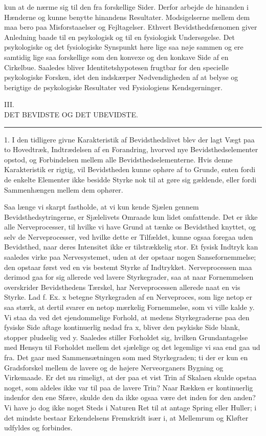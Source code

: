 \documentclass[12pt,a4paper,openany]{book}
\newcommand{\opage}[1]{\marginnote{\footnotesize\textit{[#1]}}}
\begin{document}
\opage{84}kun at de nærme sig til den fra forskellige Sider. Derfor
arbejde de hinanden i Hænderne og kunne benytte hinandens Resultater.
Modsigelserne mellem dem maa bero paa Misforstaaelser og Fejltagelser.
Ethvert Bevidsthedsfænomen giver Anledning baade til en psykologisk og
til en fysiologisk Undersøgelse. Det psykologiske og det fysiologiske
Synspunkt høre lige saa nøje sammen og ere samtidig lige saa forskellige
som den konvexe og den konkave Side af en Cirkelbue. Saaledes bliver
Identitetshypotesen frugtbar for den specielle psykologiske Forsken,
idet den indskærper Nødvendigheden af at belyse og berigtige de
psykologiske Resultater ved Fysiologiens Kendsgerninger.

\clearpage
\opage{85}\begin{center}III.\\[4pt] DET BEVIDSTE OG DET UBEVIDSTE.\\[2pt]\rule{1.5cm}{0.4pt}\end{center}

1. I den tidligere givne Karakteristik af Bevidsthedslivet blev der lagt
Vægt paa to Hovedtræk, Indtrædelsen af en Forandring, hvorved nye
Bevidsthedselementer opstod, og Forbindelsen mellem alle
Bevidsthedselementerne. Hvis denne Karakteristik er rigtig, vil
Bevidstheden kunne ophøre af to Grunde, enten fordi de enkelte Elementer
ikke besidde Styrke nok til at gøre sig gældende, eller fordi
Sammenhængen mellem dem ophører.

Saa længe vi skarpt fastholde, at vi kun kende Sjælen gennem
Bevidsthedsytringerne, er Sjælelivets Omraade kun lidet omfattende. Det
er ikke alle Nerveprocesser, til hvilke vi have Grund at tænke os
Bevidsthed knyttet, og selv de Nerveprocesser, ved hvilke dette er
Tilfældet, kunne ogsaa foregaa uden Bevidsthed, naar deres Intensitet
ikke er tilstrækkelig stor. Et fysisk Indtryk kan saaledes virke paa
Nervesystemet, uden at der opstaar nogen Sansefornemmelse; den opstaar
først ved en vis bestemt Styrke af Indtrykket. Nerveprocessen maa
derimod gaa for sig allerede ved lavere Styrkegrader, saa at naar
Fornemmelsen overskrider Bevidsthedens Tærskel, har Nerveprocessen
allerede naat en vis Styrke. Lad f. Ex. x betegne Styrkegraden af en
Nerveproces, som lige netop er saa stærk, at dertil svarer en netop
mærkelig Fornemmelse, som vi ville kalde y. Vi staa da ved det
ejendommelige Forhold, at medens Styrkegraderne paa den fysiske Side
aftage kontinuerlig nedad fra x, bliver den psykiske Side blank, stopper
pludselig ved y. Saaledes stiller Forholdet sig, hvilken Grundantagelse
med Hensyn til Forholdet
\opage{86}mellem det sjælelige og det legemlige vi saa end gaa ud fra.
Det gaar med Sammensætningen som med Styrkegraden; ti der er kun en
Gradsforskel mellem de lavere og de højere Nerveorganers Bygning og
Virkemaade. Er det nu rimeligt, at der paa et vist Trin af Skalaen
skulde opstaa noget, som aldeles ikke var til paa de lavere Trin? Naar
Rækken er kontinuerlig indenfor den ene Sfære, skulde den da ikke ogsaa
være det inden for den anden? Vi have jo dog ikke noget Steds i Naturen
Ret til at antage Spring eller Huller; i det mindste bestaar
Erkendelsens Fremskridt især i, at Mellemrum og Kløfter udfyldes og
forbindes.
\end{document}
